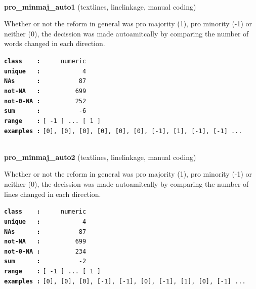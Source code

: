 \documentclass[]{article}
\begin{document}
~

\textbf{pro\_minmaj\_auto1} (textlines, linelinkage, manual coding)

Whether or not the reform in general was pro majority (1), pro minority
(-1) or neither (0), the decission was made autoamitcally by comparing
the number of words changed in each direction.

\textbf{\texttt{class\ \ \ \ :}} \texttt{~~~~~numeric}\\
\textbf{\texttt{unique\ \ \ :}} \texttt{~~~~~~~~~~~4}\\
\textbf{\texttt{NAs\ \ \ \ \ \ :}} \texttt{~~~~~~~~~~87}\\
\textbf{\texttt{not-NA\ \ \ :}} \texttt{~~~~~~~~~699}\\
\textbf{\texttt{not-0-NA\ :}} \texttt{~~~~~~~~~252}\\
\textbf{\texttt{sum\ \ \ \ \ \ :}} \texttt{~~~~~~~~~~-6}\\
\textbf{\texttt{range\ \ \ \ :}}
\texttt{{[}\ -1\ {]}\ ...\ {[}\ 1\ {]}}\\
\textbf{\texttt{examples\ :}}
\texttt{{[}0{]},\ {[}0{]},\ {[}0{]},\ {[}0{]},\ {[}0{]},\ {[}0{]},\ {[}-1{]},\ {[}1{]},\ {[}-1{]},\ {[}-1{]}\ ...}\\

~

\textbf{pro\_minmaj\_auto2} (textlines, linelinkage, manual coding)

Whether or not the reform in general was pro majority (1), pro minority
(-1) or neither (0), the decission was made autoamitcally by comparing
the number of lines changed in each direction.

\textbf{\texttt{class\ \ \ \ :}} \texttt{~~~~~numeric}\\
\textbf{\texttt{unique\ \ \ :}} \texttt{~~~~~~~~~~~4}\\
\textbf{\texttt{NAs\ \ \ \ \ \ :}} \texttt{~~~~~~~~~~87}\\
\textbf{\texttt{not-NA\ \ \ :}} \texttt{~~~~~~~~~699}\\
\textbf{\texttt{not-0-NA\ :}} \texttt{~~~~~~~~~234}\\
\textbf{\texttt{sum\ \ \ \ \ \ :}} \texttt{~~~~~~~~~~-2}\\
\textbf{\texttt{range\ \ \ \ :}}
\texttt{{[}\ -1\ {]}\ ...\ {[}\ 1\ {]}}\\
\textbf{\texttt{examples\ :}}
\texttt{{[}0{]},\ {[}0{]},\ {[}0{]},\ {[}-1{]},\ {[}-1{]},\ {[}0{]},\ {[}-1{]},\ {[}1{]},\ {[}0{]},\ {[}-1{]}\ ...}\\
\end{document}
